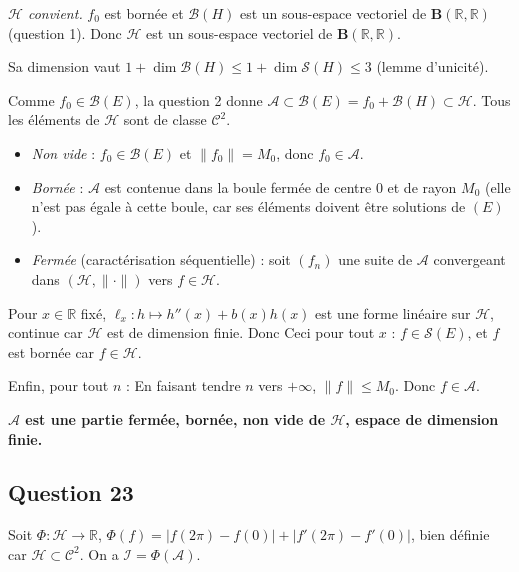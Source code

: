 \documentclass[11pt,a4paper]{article}
\providecommand{\tightlist}{\setlength{\itemsep}{0pt}\setlength{\parskip}{0pt}}
\newcommand{\equationajustee}[1]{%
  \sbox{\boiteequation}{$\displaystyle #1$}%
  \ifdim\wd\boiteequation>\linewidth
    \[\resizebox{\linewidth}{!}{\usebox{\boiteequation}}\]%
  \else
    \[#1\]%
  \fi}
\begin{document}
\emph{\(\mathcal H\) convient.} \(f_0\) est bornée et \(\mathcal B(H)\) est un sous-espace vectoriel de \(\mathbf B(\mathbb R,\mathbb R)\) (question 1). Donc \(\mathcal H\) est un sous-espace vectoriel de \(\mathbf B(\mathbb R,\mathbb R)\).

Sa dimension vaut \(1+\dim\mathcal B(H)\le1+\dim\mathcal S(H)\le3\) (lemme d'unicité).

Comme \(f_0\in\mathcal B(E)\), la question 2 donne \(\mathcal A\subset\mathcal B(E)=f_0+\mathcal B(H)\subset\mathcal H\). Tous les éléments de \(\mathcal H\) sont de classe \(\mathcal C^2\).

\begin{itemize}
\tightlist
\item
  \emph{Non vide} : \(f_0\in\mathcal B(E)\) et \(\|f_0\|=M_0\), donc \(f_0\in\mathcal A\).
\item
  \emph{Bornée} : \(\mathcal A\) est contenue dans la boule fermée de centre \(0\) et de rayon \(M_0\) (elle n'est pas égale à cette boule, car ses éléments doivent être solutions de \((E)\)).
\item
  \emph{Fermée} (caractérisation séquentielle) : soit \((f_n)\) une suite de \(\mathcal A\) convergeant dans \((\mathcal H,\|\cdot\|)\) vers \(f\in\mathcal H\).
\end{itemize}

Pour \(x\in\mathbb R\) fixé, \(\ell_x:h\mapsto h''(x)+b(x)h(x)\) est une forme linéaire sur \(\mathcal H\), continue car \(\mathcal H\) est de dimension finie. Donc
\equationajustee{\ell_x(f)=\lim_{n\to+\infty}\ell_x(f_n)=c(x).}
Ceci pour tout \(x\) : \(f\in\mathcal S(E)\), et \(f\) est bornée car \(f\in\mathcal H\).

Enfin, pour tout \(n\) :
\equationajustee{\begin{aligned}
\|f\|&\le\|f-f_n\|+\|f_n\|\\
&\le\|f-f_n\|+M_0.
\end{aligned}}
En faisant tendre \(n\) vers \(+\infty\), \(\|f\|\le M_0\). Donc \(f\in\mathcal A\).

\textbf{\(\mathcal A\) est une partie fermée, bornée, non vide de \(\mathcal H\), espace de dimension finie.}

\hypertarget{question-23}{%
\subsection{Question 23}\label{question-23}}

Soit \(\Phi:\mathcal H\to\mathbb R\), \(\Phi(f)=|f(2\pi)-f(0)|+|f'(2\pi)-f'(0)|\), bien définie car \(\mathcal H\subset\mathcal C^2\). On a \(\mathcal I=\Phi(\mathcal A)\).
\end{document}
